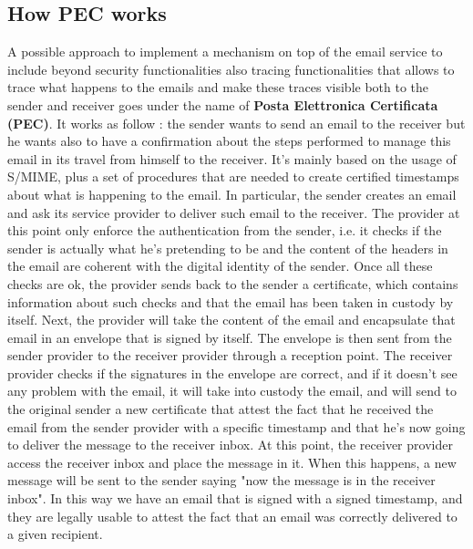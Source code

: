 \subsection{How PEC works}
A possible approach to implement a mechanism on top of the email service to include beyond security functionalities also tracing functionalities that allows to trace what happens to the emails and make these traces visible both to the sender and receiver goes under the name of \textbf{Posta Elettronica Certificata (PEC)}. It works as follow : the sender wants to send an email to the receiver but he wants also to have a confirmation about the steps performed to manage this email in its travel from himself to the receiver. It's mainly based on the usage of S/MIME, plus a set of procedures that are needed to create certified timestamps about what is happening to the email. In particular, the sender creates an email and ask its service provider to deliver such email to the receiver. The provider at this point only enforce the authentication from the sender, i.e. it checks if the sender is actually what he's pretending to be and the content of the headers in the email are coherent with the digital identity of the sender. Once all these checks are ok, the provider sends back to the sender a certificate, which contains information about such checks and that the email has been taken in custody by itself. Next, the provider will take the content of the email and encapsulate that email in an envelope that is signed by itself. The envelope is then sent from the sender provider to the receiver provider through a reception point. The receiver provider checks if the signatures in the envelope are correct, and if it doesn't see any problem with the email, it will take into custody the email, and will send to the original sender a new certificate that attest the fact that he received the email from the sender provider with a specific timestamp and that he's now going to deliver the message to the receiver inbox. At this point, the receiver provider access the receiver inbox and place the message in it. When this happens, a new message will be sent to the sender saying "now the message is in the receiver inbox". In this way we have an email that is signed with a signed timestamp, and they are legally usable to attest the fact that an email was correctly delivered to a given recipient.